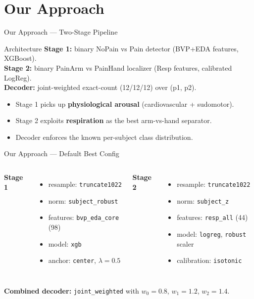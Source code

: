 \documentclass[aspectratio=169,10pt]{beamer}
\begin{document}
\section{Our Approach}

\begin{frame}{Our Approach — Two-Stage Pipeline}
  \begin{block}{Architecture}
    \textbf{Stage 1:} binary NoPain vs Pain detector (BVP+EDA features, XGBoost).\\
    \textbf{Stage 2:} binary PainArm vs PainHand localizer (Resp features, calibrated LogReg).\\
    \textbf{Decoder:} joint-weighted exact-count (12/12/12) over (p1, p2).
  \end{block}
  \begin{itemize}
    \item Stage 1 picks up \textbf{physiological arousal} (cardiovascular + sudomotor).
    \item Stage 2 exploits \textbf{respiration} as the best arm-vs-hand separator.
    \item Decoder enforces the known per-subject class distribution.
  \end{itemize}
\end{frame}

\begin{frame}{Our Approach — Default Best Config}
  \small
  \begin{columns}[T,onlytextwidth]
    \textbf{Stage 1}
    \begin{itemize}
      \item resample: \texttt{truncate1022}
      \item norm: \texttt{subject\_robust}
      \item features: \texttt{bvp\_eda\_core} (98)
      \item model: \texttt{xgb}
      \item anchor: \texttt{center}, $\lambda=0.5$
    \end{itemize}
    \textbf{Stage 2}
    \begin{itemize}
      \item resample: \texttt{truncate1022}
      \item norm: \texttt{subject\_z}
      \item features: \texttt{resp\_all} (44)
      \item model: \texttt{logreg}, \texttt{robust} scaler
      \item calibration: \texttt{isotonic}
    \end{itemize}
  \end{columns}
  \vspace{4pt}
  \textbf{Combined decoder:} \texttt{joint\_weighted} with $w_0{=}0.8$, $w_1{=}1.2$, $w_2{=}1.4$.
\end{frame}
\end{document}
